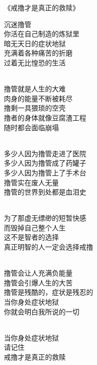 \begin{center}
    《戒撸才是真正的救赎》\it
    \begin{multicols}{2}
        沉迷撸管 \\ 你活在自己制造的炼狱里 \\ 暗无天日的症状地狱 \\ 充满着各种痛苦的折磨 \\ 过着无比惶恐的生活

        ~\\

        撸管就是人生的大难 \\ 肉身的能量不断被耗尽 \\ 撸剩一具猥琐的空壳 \\ 撸者的身体就像豆腐渣工程 \\ 随时都会面临崩塌

        ~\\

        多少人因为撸管走进了医院 \\ 多少人因为撸管成了药罐子 \\ 多少人因为撸管上了手术台 \\ 撸管实在废人无量 \\ 撸管的世界到处都是血泪史

        ~\\

        为了那虚无缥缈的短暂快感 \\ 而毁掉自己整个人生 \\ 这不是智者的选择 \\ 真正明智的人一定会选择戒撸

        ~\\

        撸管会让人充满负能量 \\ 撸管会引爆人生的大苦 \\ 撸管是残酷的，症状是残忍的 \\ 当你身处症状地狱 \\ 你就会明白我所说的一切

        ~\\

        当你身处症状地狱 \\ 请记住 \\ 戒撸才是真正的救赎
    \end{multicols}
\end{center}


